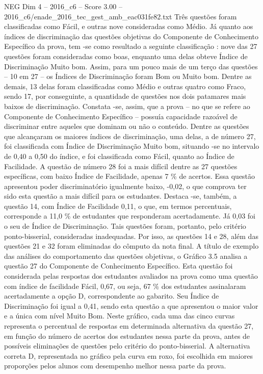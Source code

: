 \begin{textsample}{NEG Dim 4 – 2016\_c6 – Score 3.00 – 2016\_c6/enade\_2016\_tec\_gest\_amb\_eac031fe82.txt}
Três questões foram classificadas como Fácil, e outras nove consideradas como Médio.
Já quanto aos índices de discriminação das questões objetivas do Componente de Conhecimento Específico da prova, tem -se como resultado a seguinte classificação : nove das 27 questões foram consideradas como boas, enquanto uma delas obteve Índice de Discriminação Muito bom.
Assim, para um pouco mais de um terço das questões – 10 em 27 – os Índices de Discriminação foram Bom ou Muito bom.
Dentre as demais, 13 delas foram classificadas como Médio e outras quatro como Fraco, sendo 17, por conseguinte, a quantidade de questões nos dois patamares mais baixos de discriminação.
Constata -se, assim, que a prova – no que se refere ao Componente de Conhecimento Específico – possuía capacidade razoável de discriminar entre aqueles que dominam ou não o conteúdo.
Dentre as questões que alcançaram os maiores índices de discriminação, uma delas, a de número 27, foi classificada com Índice de Discriminação Muito bom, situando -se no intervalo de 0,40 a 0,50 do índice, e foi classificada como Fácil, quanto ao Índice de Facilidade.
A questão de número 28 foi a mais difícil dentre as 27 questões específicas, com baixo Índice de Facilidade, apenas 7 \% de acertos.
Essa questão apresentou poder discriminatório igualmente baixo, -0,02, o que comprova ter sido esta questão a mais difícil para os estudantes.
Destaca -se, também, a questão 14, com Índice de Facilidade 0,11, o que, em termos percentuais, corresponde a 11,0 \% de estudantes que responderam acertadamente.
Já 0,03 foi o seu de Índice de Discriminação.
Tais questões foram, portanto, pelo critério ponto-bisserial, consideradas inadequadas.
Por isso, as questões 14 e 28, além das questões 21 e 32 foram eliminadas do cômputo da nota final.
A título de exemplo das análises do comportamento das questões objetivas, o Gráfico 3.5 analisa a questão 27 do Componente de Conhecimento Específico.
Esta questão foi considerada pelas respostas dos estudantes avaliados na prova como uma questão com índice de facilidade Fácil, 0,67, ou seja, 67 \% dos estudantes assinalaram acertadamente a opção D, correspondente ao gabarito.
Seu Índice de Discriminação foi igual a 0,41, sendo esta questão a que apresentou o maior valor e a única com nível Muito Bom.
Neste gráfico, cada uma das cinco curvas representa o percentual de respostas em determinada alternativa da questão 27, em função do número de acertos dos estudantes nessa parte da prova, antes de possíveis eliminações de questões pelo critério do ponto-bisserial.
A alternativa correta D, representada no gráfico pela curva em roxo, foi escolhida em maiores proporções pelos alunos com desempenho melhor nessa parte da prova.

\end{textsample}
